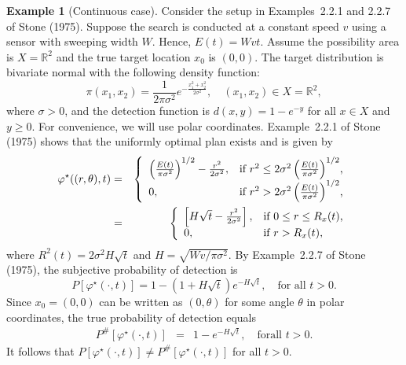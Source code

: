 \documentclass[12pt]{article}
\theoremstyle{plain}
\theoremstyle{definition}
\newtheorem{example}{Example}%
\theoremstyle{remark}
\begin{document}

\begin{example}[Continuous case]
\label{ex:continuous2}
Consider the setup in Examples~2.2.1 and 2.2.7 of Stone (1975).  Suppose the search is conducted at a constant speed $v$ using a sensor with sweeping width $W$.  Hence,  $E(t)=Wvt$.  Assume the possibility area is $X=\mathbb{R}^2$ and the true target location $x_0$ is $(0, 0)$.  The target distribution is bivariate normal with the following density function:
\begin{equation}
\pi(x_1, x_2)=\frac{1}{2\pi\sigma^2}e^{-\frac{x_1^2+x_2^2}{2\sigma^2}}, \quad (x_1, x_2)\in X= \mathbb{R}^2,
\end{equation}
where $\sigma>0$, and the detection function is $d(x, y)=1-e^{-y}$ for all $x\in X$ and $y\geq 0$. For convenience, we will use polar coordinates.  Example~2.2.1 of Stone (1975) shows that  the uniformly optimal plan exists and is given by
\begin{eqnarray*}
\varphi^\star((r, \theta), t) &=& \left\{
		                           \begin{array}{ll}
		                           \left(\frac{ E(t)}{\pi \sigma^2}\right)^{1/2}-\frac{r^2}{2\sigma^2},& \hbox{if $r^2\leq 2\sigma^2\left(\frac{E(t)}{\pi \sigma^2}\right)^{1/2}$,} \\
					0, & \hbox{if $r^2> 2\sigma^2\left(\frac{E(t)}{\pi \sigma^2}\right)^{1/2}$,} 
		                          \end{array}
		                         \right.\\
		                         &=& 
		                          \left\{
		                           \begin{array}{ll}
		                          \left[H\sqrt{t}-\frac{r^2}{2\sigma^2}\right],& \hbox{if $0\leq r\leq R_x(t)$,} \\
					0, & \hbox{if $r>R_x(t)$,} 
		                          \end{array}
		                         \right.
\end{eqnarray*}		                        	                         
where $R^2(t)=2\sigma^2H\sqrt{t}$ and $H=\sqrt{Wv/\pi\sigma^2}$.   By Example~2.2.7 of Stone (1975), the subjective probability of detection is 
\begin{equation}
P[\varphi^\star(\cdot, t)]=1-(1+H\sqrt{t})e^{-H\sqrt{t}}, \quad \text{for all $t>0$}.
\end{equation}
Since $x_0=(0,0)$ can be written as $(0, \theta)$ for some angle $\theta$ in polar coordinates,  the true probability of detection  equals 
\begin{eqnarray*}
P^{\#}[\varphi^\star(\cdot, t)] &=& 
		                             1-e^{-H \sqrt{t}}, \quad \text{forall $t>0$}.
\end{eqnarray*}
It follows that $P[\varphi^\star(\cdot, t)]\neq P^{\#}[\varphi^\star(\cdot, t)]$ for all $t> 0$.
\end{example}
\end{document}
